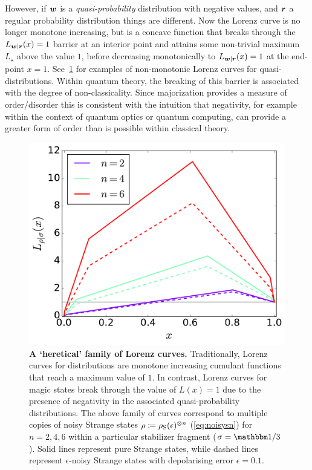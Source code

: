 \documentclass[pra,
aps,
twocolumn,
superscriptaddress,
groupedaddress,
nofootinbib,
reprint
]{revtex4-1}
\begin{document}
However, if $\boldsymbol{w}$ is a \emph{quasi-probability} distribution with negative values, and $\boldsymbol{r}$ a regular probability distribution things are different. Now the Lorenz curve is no longer monotone increasing, but is a concave function that breaks through the $L_{\boldsymbol{w}|\boldsymbol{r}}(x) = 1$ barrier at an interior point and attains some non-trivial maximum $L_\star$ above the value $1$, before decreasing monotonically to $L_{\boldsymbol{w}|\boldsymbol{r}}(x)= 1$ at the end-point $x=1$. See~\cref{fig:lcs} for examples of non-monotonic Lorenz curves for quasi-distributions. Within quantum theory, the breaking of this barrier is associated with the degree of non-classicality. Since majorization provides a measure of order/disorder this is consistent with the intuition that negativity, for example within the context of quantum optics or quantum computing, can provide a greater form of order than is possible within classical theory.

\begin{figure}
    \centering
    \includegraphics[scale=0.35]{figs/lc_strange.pdf}
    \caption{\textbf{A `heretical' family of Lorenz curves.} Traditionally, Lorenz curves for distributions are monotone increasing cumulant functions that reach a maximum value of $1$. In contrast, Lorenz curves for magic states break through the value of $L(x)=1$ due to the presence of negativity in the associated quasi-probability distributions. The above family of curves correspond to multiple copies of noisy Strange states $\rho\coloneqq\rho_{\rm{S}}(\epsilon)^{\otimes n}$ (\cref{eq:noisysn}) for $n=2,4,6$ within a particular stabilizer fragment ($\sigma = \id/3$). Solid lines represent pure Strange states, while dashed lines represent $\epsilon$-noisy Strange states with depolarising error $\epsilon = 0.1$.
    }
    \label{fig:lcs}
\end{figure}
\end{document}
